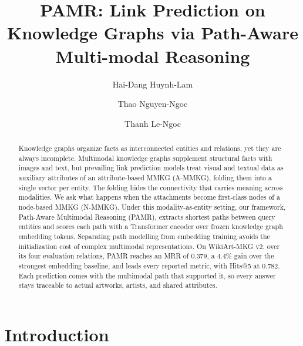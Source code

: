 \documentclass[runningheads]{llncs}
\begin{document}
%
\title{PAMR: Link Prediction on Knowledge Graphs via Path-Aware Multi-modal Reasoning}
%

\author{Hai-Dang Huynh-Lam \and
  Thao Nguyen-Ngoc \and
Thanh Le-Ngoc}
%
%
\maketitle  %
%
\begin{abstract}
  Knowledge graphs organize facts as interconnected entities and relations, yet
  they are always incomplete. Multimodal knowledge graphs supplement structural
  facts with images and text, but prevailing link prediction models treat visual
  and textual data as auxiliary attributes of an attribute-based MMKG (A-MMKG),
  folding them into a single vector per entity. The folding hides the
  connectivity that carries meaning across modalities. We ask what happens when
  the attachments become first-class nodes of a node-based MMKG (N-MMKG). Under
  this modality-as-entity setting, our framework, Path-Aware Multimodal
  Reasoning (PAMR), extracts shortest paths between query entities and scores
  each path with a Transformer encoder over frozen knowledge graph embedding
  tokens. Separating path modelling from embedding training avoids the
  initialization cost of complex multimodal representations. On WikiArt-MKG v2,
  over its four evaluation relations, PAMR
  reaches an MRR of 0.379, a 4.4\% gain over the strongest embedding
  baseline, and leads every reported metric, with Hits@5 at 0.782. Each prediction comes with the multimodal path
  that supported it, so every answer stays traceable to actual artworks,
  artists, and shared attributes.

\end{abstract}
%
%
%

\section{Introduction}
\label{sec:introduction}
\end{document}
